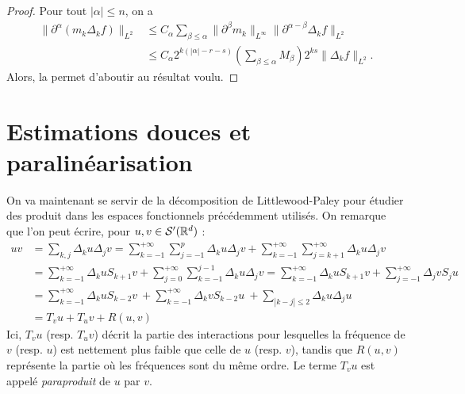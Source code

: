 \documentclass[11pt,a4paper]{article}
\begin{document}
\begin{proof}
Pour tout $|\alpha|\leq n$, on a 
\begin{align*}
\|\partial^\alpha (m_k\Delta_kf)\|_{L^2} &\leq C_\alpha \sum_{\beta \leq \alpha} \|\partial^\beta m_k\|_{L^\infty} \|\partial^{\alpha-\beta}\Delta_kf\|_{L^2} \\
&\leq C_\alpha 2^{k(|\alpha|-r-s)}\left(\sum_{\beta\leq \alpha} M_\beta \right)2^{ks}\|\Delta_kf\|_{L^2}.
\end{align*}
Alors, la  permet d'aboutir au résultat voulu.
\end{proof}
\section{Estimations douces et paralinéarisation}
On va maintenant se servir de la décomposition de Littlewood-Paley pour étudier des produit dans les espaces fonctionnels précédemment utilisés. On remarque que l'on peut écrire, pour $u,v \in \mathcal{S}'(\mathbb R^d)$ : 
\begin{align*}
uv &=\sum_{k,j}\Delta_ku\Delta_jv = \sum_{k=-1}^{+\infty}\sum_{j=-1}^{p}\Delta_ku\Delta_jv + \sum_{k=-1}^{+\infty}\sum_{j=k+1}^{+\infty}\Delta_ku\Delta_jv \\
&=\sum_{k=-1}^{+\infty}\Delta_kuS_{k+1}v +  \sum_{j=0}^{+\infty}\sum_{k=-1}^{j-1}\Delta_ku\Delta_jv = \sum_{k=-1}^{+\infty}\Delta_kuS_{k+1}v +  \sum_{j=-1}^{+\infty}\Delta_jvS_{j}u \\
&= \sum_{k=-1}^{+\infty}\Delta_kuS_{k-2}v  \ +  \sum_{k=-1}^{+\infty}\Delta_kvS_{k-2}u \ + \sum_{|k-j|\leq 2} \Delta_ku\Delta_ju \\
&= T_vu + T_uv + R(u,v)
\end{align*}
Ici, $T_vu$ (resp. $T_uv$) décrit la partie des interactions pour lesquelles la fréquence de $v$ (resp. $u$) est nettement plus faible que celle de $u$ (resp. $v$), tandis que $R(u,v)$ représente la partie où les fréquences sont du même ordre. Le terme $T_vu$ est appelé \textit{paraproduit} de $u$ par $v$.
\end{document}
